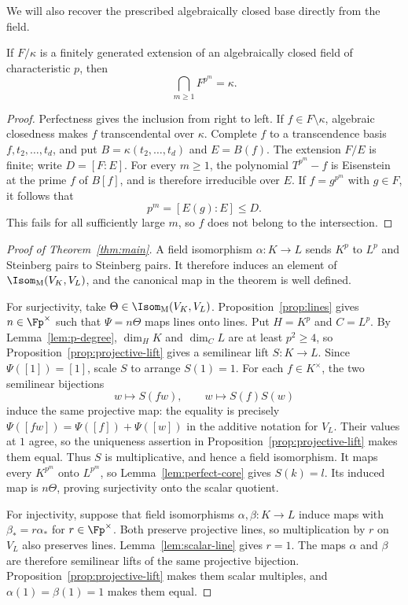 We will also recover the prescribed algebraically closed base directly
from the field.

\begin{lemma}\label{lem:perfect-core}
If $F/\kappa$ is a finitely generated extension of an algebraically
closed field of characteristic $p$, then
\[
 \bigcap_{m\ge1} F^{p^m}=\kappa.
\]
\end{lemma}

\begin{proof}
Perfectness gives the inclusion from right to left. If $f\in
F\setminus\kappa$, algebraic closedness makes $f$ transcendental over
$\kappa$. Complete $f$ to a transcendence basis
$f,t_2,\ldots,t_d$, and put
$B=\kappa(t_2,\ldots,t_d)$ and $E=B(f)$. The extension $F/E$ is
finite; write $D=[F:E]$. For every $m\ge1$, the polynomial
$T^{p^m}-f$ is Eisenstein at the prime $f$ of $B[f]$, and is therefore
irreducible over $E$. If $f=g^{p^m}$ with $g\in F$, it follows that
\[
 p^m=[E(g):E]\le D.
\]
This fails for all sufficiently large $m$, so $f$ does not belong to
the intersection.
\end{proof}

\begin{proof}[Proof of Theorem~\ref{thm:main}]
A field isomorphism $\alpha:K\to L$ sends $K^p$ to $L^p$ and
Steinberg pairs to Steinberg pairs. It therefore induces an element
of $\Isom_{\mathrm M}(V_K,V_L)$, and the canonical map in the theorem
is well defined.

For surjectivity, take $\Theta\in\Isom_{\mathrm M}(V_K,V_L)$.
Proposition~\ref{prop:lines} gives $n\in\Fp^\times$ such that
$\Psi=n\Theta$ maps lines onto lines. Put $H=K^p$ and $C=L^p$.
By Lemma~\ref{lem:p-degree}, $\dim_H K$ and $\dim_C L$ are at least
$p^2\ge4$, so
Proposition~\ref{prop:projective-lift} gives a semilinear lift
$S:K\to L$. Since $\Psi([1])=[1]$, scale $S$ to arrange $S(1)=1$.
For each $f\in K^\times$, the two semilinear bijections
\[
 w\longmapsto S(fw),\qquad w\longmapsto S(f)S(w)
\]
induce the same projective map: the equality is precisely
$\Psi([fw])=\Psi([f])+\Psi([w])$ in the additive notation for $V_L$.
Their values at $1$ agree, so the uniqueness assertion in
Proposition~\ref{prop:projective-lift} makes them equal. Thus $S$ is
multiplicative, and hence a field isomorphism. It maps every
$K^{p^m}$ onto $L^{p^m}$, so Lemma~\ref{lem:perfect-core} gives
$S(k)=l$. Its induced map is $n\Theta$, proving surjectivity onto the
scalar quotient.

For injectivity, suppose that field isomorphisms $\alpha,\beta:K\to L$
induce maps with $\beta_*=r\alpha_*$ for $r\in\Fp^\times$.
Both preserve projective lines, so multiplication by $r$ on $V_L$
also preserves lines. Lemma~\ref{lem:scalar-line} gives $r=1$.
The maps $\alpha$ and $\beta$ are therefore semilinear lifts of the
same projective bijection. Proposition~\ref{prop:projective-lift}
makes them scalar multiples, and $\alpha(1)=\beta(1)=1$ makes them
equal.
\end{proof}


